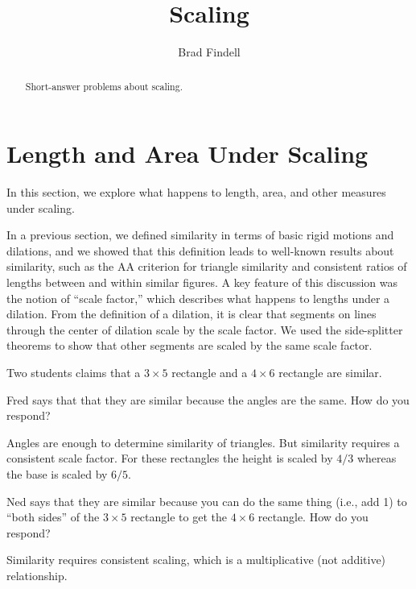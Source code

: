 \documentclass[nooutcomes]{ximera}
\title{Scaling}
\author{Brad Findell}
\begin{document}
\begin{abstract}
Short-answer problems about scaling. 
\end{abstract}
\maketitle




\section{Length and Area Under Scaling}
In this section, we explore what happens to length, area, and other measures under scaling.  
 
In a previous section, we defined similarity in terms of basic rigid motions and dilations, and we showed that this definition leads to well-known results about similarity, such as the AA criterion for triangle similarity and consistent ratios of lengths between and within similar figures. A key feature of this discussion was the notion of ``scale factor,'' which describes what happens to lengths under a dilation.  From the definition of a dilation, it is clear that segments on lines through the center of dilation scale by the scale factor.  We used the side-splitter theorems to show that other segments are scaled by the same scale factor.  

\begin{question}
Two students claims that a $3\times 5$ rectangle and a $4\times 6$ rectangle are similar.  

Fred says that that they are similar because the angles are the same.  How do you respond?  
\begin{freeResponse}
\begin{hint}
Angles are enough to determine similarity of triangles.  But similarity requires a consistent scale factor.  For these rectangles the height is scaled by $4/3$ whereas the base is scaled by $6/5$.  
\end{hint}
\end{freeResponse}

Ned says that they are similar because you can do the same thing (i.e., add 1) to ``both sides'' of the $3\times 5$ rectangle to get the $4\times 6$ rectangle.  How do you respond?  
\begin{freeResponse}
\begin{hint}
Similarity requires consistent scaling, which is a multiplicative (not additive) relationship.  
\end{hint}
\end{freeResponse}
\end{question}
\end{document}
